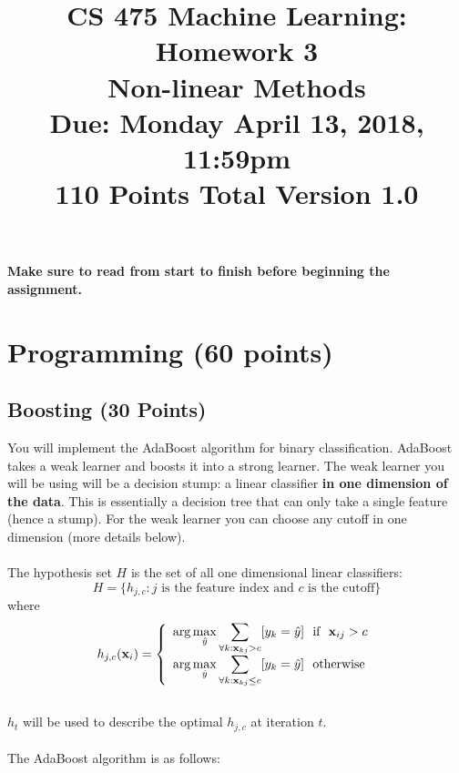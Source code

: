 \documentclass[11pt]{article}
\title{CS 475 Machine Learning: Homework 3\\Non-linear Methods\\
	\Large{Due: Monday April 13, 2018, 11:59pm}\\
	110 Points Total \hspace{1cm} Version 1.0}
\author{}
\date{}
\newcommand{\vx}{{\bf x}}
\newcommand{\vxi}{{\bf x}_i}
\newcommand{\vxij}{{\bf x}_{ij}}
\newcommand{\yh}{\hat{y}}
\begin{document}
	\large
	\maketitle
	\thispagestyle{headings}
	
	\vspace{-.5in}
	
	{\bf Make sure to read from start to finish before beginning the assignment.}
	\section{Programming (60 points)}
	
	\subsection{Boosting (30 Points)}
	You will implement the AdaBoost algorithm for binary classification. AdaBoost takes a weak learner and boosts it into a strong learner. The weak learner you will be using will be a decision stump: a linear classifier \textbf{in one dimension of the data}. This is essentially a decision tree that can only take a single feature (hence a stump). For the weak learner you can choose any cutoff in one dimension (more details below).\\
	\\
	The hypothesis set $H$ is the set of all one dimensional linear classifiers:\\
	\[
	H=\{h_{j,c} : \textrm{$j$ is the feature index and $c$ is the cutoff}\} 
	\]
	where \\
	\[
	h_{j,c}(\vxi) =\left\{
	\begin{array}{lr}
	\displaystyle \arg\max_{\yh} \sum_{\forall k : \vx_{kj} > c} [y_k = \yh] ~~  \textrm{if} ~~ \vxij > c  \\
	\displaystyle \arg\max_{\yh} \sum_{\forall k : \vx_{kj} \le c} [y_k = \yh] ~~ \textrm{otherwise}
	\end{array}
	\right.
	\]
	\\   
	$h_t$ will be used to describe the optimal $h_{j,c}$ at iteration $t$.\\
	\\
	The AdaBoost algorithm is as follows:\\
\end{document}

